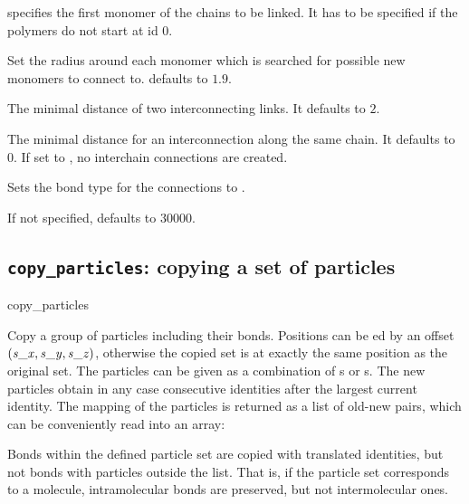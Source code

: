 \begin{arguments}
\item[\opt{start \var{pid}}]  specifies the first monomer of
  the chains to be linked. It has to be specified if the polymers do
  not start at id 0.
\item[\opt{catch \var{r_catch}}] Set the radius around each monomer
  which is searched for possible new monomers to connect to.
   defaults to $1.9$.
\item[\opt{distLink \var{link\_dist}}] The minimal distance of two
  interconnecting links. It defaults to $2$.
\item[\opt{distChain \var{chain\_dist}}] The minimal distance for an
  interconnection along the same chain. It defaults to $0$. If set to
  , no interchain connections are created.
\item[\opt{FENE \var{bondid}}] Sets the bond type for the connections
  to .
\item[\opt{trials \var{try_\mathrm{max}}}] If not specified,
   defaults to $30000$.
\end{arguments}

\subsection{\texttt{copy\_particles}: copying a set of particles}
\begin{essyntax}
  copy_particles
\end{essyntax}

Copy a group of particles including their bonds. Positions can be
ed by an offset $(\mathrm{\mathit{s\_x}}, \mathrm{\mathit{s\_y}}, \mathrm{\mathit{s\_z}})$,
otherwise the copied set is at exactly the same position as the
original set. The particles can be given as a combination of
s or s. The new particles obtain in any case
consecutive identities after the largest current identity. The mapping
of the particles is returned as a list of old-new pairs, which can be
conveniently read into an array:

Bonds within the defined particle set are copied with translated identities,
but not bonds with particles outside the list. That is, if the
particle set corresponds to a molecule, intramolecular bonds are
preserved, but not intermolecular ones.

